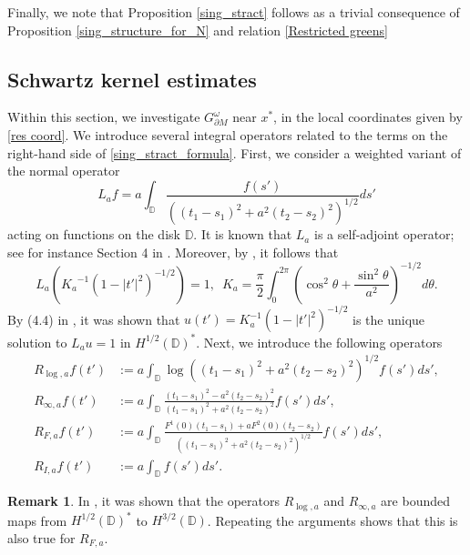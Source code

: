 \documentclass[12pt,a4paper]{amsart}
\numberwithin{equation}{section}
\theoremstyle{plain}
\theoremstyle{definition}
\newtheorem{remark}[theorem]{Remark}
\newcommand{\D}{\mathbb{D}}
\begin{document}
Finally, we note that Proposition \ref{sing_stract} follows as a trivial consequence of Proposition \ref{sing_structure_for_N} and relation \eqref{Restricted greens}

\subsection{Schwartz kernel estimates} Within this section, we investigate $G_{\partial M}^\omega$ near $x^*$, in the local coordinates given by \eqref{res coord}. We introduce several integral operators related to the terms on the right-hand side of \eqref{sing_stract_formula}. First, we consider a weighted variant of the normal operator
\begin{equation}\label{La}
    L_a f = a \int_{\mathbb{D}} \frac{f(s')}{\left((t_1 - s_1)^2 + a^2(t_2 - s_2)^2\right)^{1/2}} ds'
\end{equation}
acting on functions on the disk $\D$. It is known that $L_a$ is a self-adjoint operator; see for instance Section 4 in \cite{NursultanovTzouTzou}. Moreover, by \cite{schuss2006ellipse}, it follows that 
\begin{equation}\label{La u = 1}
    L_a  \left({K_a}^{-1} {(1 - |t'|^2)^{-1/2}}\right) = 1, \;\ K_a = \frac{\pi}{2} \int_{0}^{2 \pi} \left( \cos^2 \theta + \frac{\sin^2 \theta}{a^2} \right)^{-1/2} d \theta. 
\end{equation}
	By (4.4) in \cite{NursultanovTzouTzou}, it was shown that $u(t')=K_a^{-1}(1-|t'|^2)^{-1/2}$ is the unique solution to $L_a u = 1$ in $H^{1/2}(\mathbb{D})^*$. Next, we introduce the following operators
	\begin{align*}
		R_{\log,a} f(t') &:= a \int_\D \log\left((t_1 - s_1)^2 + a^2 (t_2-s_2)^2 \right)^{1/2} f(s') ds', \\ 
		R_{\infty,a} f(t') &:= a \int_{\mathbb{D}} \frac{(t_1 - s_1)^2 - a^2 (t_2 - s_2)^2}{(t_1 - s_1)^2 + a^2 (t_2 - s_2)^2} f(s') ds',\\
		R_{F,a} f(t') &:= a \int_{\mathbb{D}} \frac{F^1(0)(t_1 - s_1) + a F^2(0) (t_2 - s_2)}{((t_1 - s_1)^2 + a^2 (t_2 - s_2)^2)^{1/2}} f(s') ds',\\
		R_{I,a}f(t') &:= a\int_{\mathbb{D}} f(s')ds'.
	\end{align*}
	\begin{remark}\label{rem}
		In \cite{NursultanovTzouTzou}, it was shown that the operators $R_{\log,a}$ and $R_{\infty,a}$ are bounded maps from $H^{1/2}(\D)^*$ to $H^{3/2}(\D)$. Repeating the arguments shows that this is also true for $R_{F,a}$. 
	\end{remark}
\end{document}
